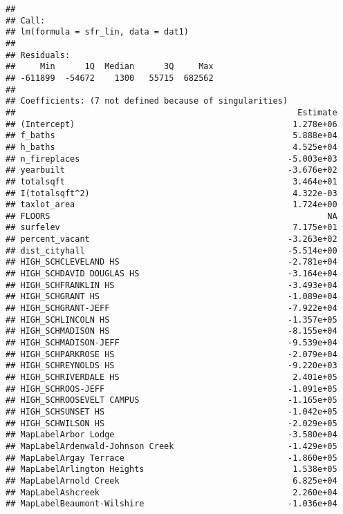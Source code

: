 \documentclass[]{article}
\begin{document}
\begin{verbatim}
## 
## Call:
## lm(formula = sfr_lin, data = dat1)
## 
## Residuals:
##     Min      1Q  Median      3Q     Max 
## -611899  -54672    1300   55715  682562 
## 
## Coefficients: (7 not defined because of singularities)
##                                                         Estimate
## (Intercept)                                            1.278e+06
## f_baths                                                5.888e+04
## h_baths                                                4.525e+04
## n_fireplaces                                          -5.003e+03
## yearbuilt                                             -3.676e+02
## totalsqft                                              3.464e+01
## I(totalsqft^2)                                         4.322e-03
## taxlot_area                                            1.724e+00
## FLOORS                                                        NA
## surfelev                                               7.175e+01
## percent_vacant                                        -3.263e+02
## dist_cityhall                                         -5.514e+00
## HIGH_SCHCLEVELAND HS                                  -2.781e+04
## HIGH_SCHDAVID DOUGLAS HS                              -3.164e+04
## HIGH_SCHFRANKLIN HS                                   -3.493e+04
## HIGH_SCHGRANT HS                                      -1.089e+04
## HIGH_SCHGRANT-JEFF                                    -7.922e+04
## HIGH_SCHLINCOLN HS                                    -1.357e+05
## HIGH_SCHMADISON HS                                    -8.155e+04
## HIGH_SCHMADISON-JEFF                                  -9.539e+04
## HIGH_SCHPARKROSE HS                                   -2.079e+04
## HIGH_SCHREYNOLDS HS                                   -9.220e+03
## HIGH_SCHRIVERDALE HS                                   2.401e+05
## HIGH_SCHROOS-JEFF                                     -1.091e+05
## HIGH_SCHROOSEVELT CAMPUS                              -1.165e+05
## HIGH_SCHSUNSET HS                                     -1.042e+05
## HIGH_SCHWILSON HS                                     -2.029e+05
## MapLabelArbor Lodge                                   -3.580e+04
## MapLabelArdenwald-Johnson Creek                       -1.429e+05
## MapLabelArgay Terrace                                 -1.860e+05
## MapLabelArlington Heights                              1.538e+05
## MapLabelArnold Creek                                   6.825e+04
## MapLabelAshcreek                                       2.260e+04
## MapLabelBeaumont-Wilshire                             -1.036e+04

\end{verbatim}
\end{document}
